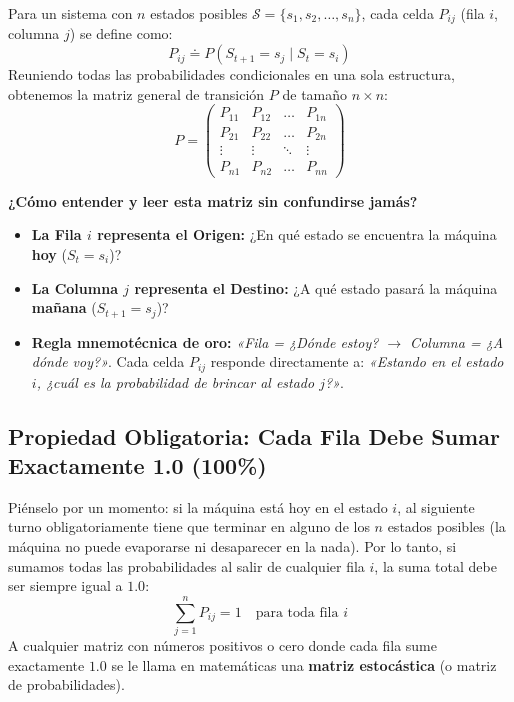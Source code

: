 Para un sistema con $n$ estados posibles $\mathcal{S} = \{s_1, s_2, \dots, s_n\}$, cada celda $P_{ij}$ (fila $i$, columna $j$) se define como:
\begin{equation}
  P_{ij} \doteq P(S_{t+1} = s_j \mid S_t = s_i)
\end{equation}
Reuniendo todas las probabilidades condicionales en una sola estructura, obtenemos la matriz general de transición $P$ de tamaño $n \times n$:
\begin{equation}
  P = \begin{pmatrix}
    P_{11} & P_{12} & \dots & P_{1n} \\
    P_{21} & P_{22} & \dots & P_{2n} \\
    \vdots & \vdots & \ddots & \vdots \\
    P_{n1} & P_{n2} & \dots & P_{nn}
  \end{pmatrix}
\end{equation}

\noindent \textbf{¿Cómo entender y leer esta matriz sin confundirse jamás?}
\begin{itemize}
  \item \textbf{La Fila $i$ representa el Origen:} ¿En qué estado se encuentra la máquina \textbf{hoy} ($S_t = s_i$)?
  \item \textbf{La Columna $j$ representa el Destino:} ¿A qué estado pasará la máquina \textbf{mañana} ($S_{t+1} = s_j$)?
  \item \textbf{Regla mnemotécnica de oro:} \textit{«Fila = ¿Dónde estoy? $\to$ Columna = ¿A dónde voy?»}. Cada celda $P_{ij}$ responde directamente a: \textit{«Estando en el estado $i$, ¿cuál es la probabilidad de brincar al estado $j$?»}.
\end{itemize}

\subsection*{Propiedad Obligatoria: Cada Fila Debe Sumar Exactamente 1.0 (100\%)}
Piénselo por un momento: si la máquina está hoy en el estado $i$, al siguiente turno obligatoriamente tiene que terminar en alguno de los $n$ estados posibles (la máquina no puede evaporarse ni desaparecer en la nada). Por lo tanto, si sumamos todas las probabilidades al salir de cualquier fila $i$, la suma total debe ser siempre igual a $1.0$:
\begin{equation}
  \sum_{j=1}^n P_{ij} = 1 \quad \text{para toda fila } i
\end{equation}
A cualquier matriz con números positivos o cero donde cada fila sume exactamente $1.0$ se le llama en matemáticas una \textbf{matriz estocástica} (o matriz de probabilidades).

